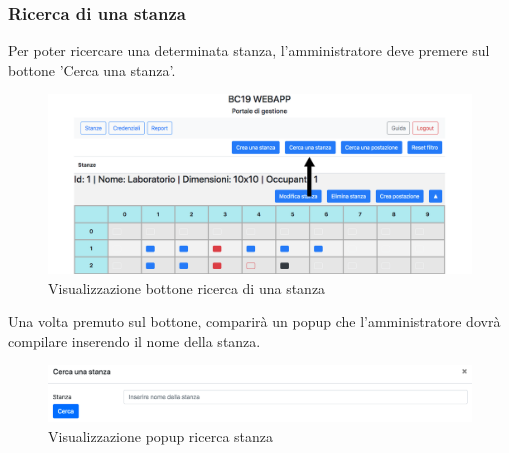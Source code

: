 \subsubsection{Ricerca di una stanza}
Per poter ricercare una determinata stanza, l'amministratore deve premere sul bottone 'Cerca una stanza'.
\begin{figure}[H]
	\centering
	\includegraphics[width=15cm]{res/images/bottoneSearchRoom.png}
	\caption{Visualizzazione bottone ricerca di una stanza}
\end{figure}
Una volta premuto sul bottone, comparirà un popup che l'amministratore dovrà compilare inserendo il nome della stanza.
\begin{figure}[H]
	\centering
	\includegraphics[width=15cm]{res/images/searchRoom.png}
	\caption{Visualizzazione popup ricerca stanza}
\end{figure}

